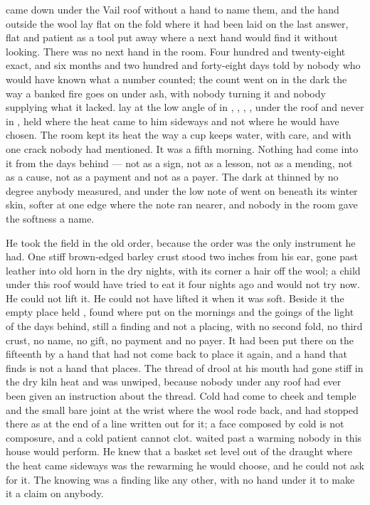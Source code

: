 
 came down under the Vail roof without a hand to name them, and the hand outside the wool lay flat on the fold where it had been laid on the last answer, flat and patient as a tool put away where a next hand would find it without looking. There was no next hand in the room. Four hundred and twenty-eight exact, and six months and two hundred and forty-eight days told by nobody who would have known what a number counted; the count went on in the dark the way a banked fire goes on under ash, with nobody turning it and nobody supplying what it lacked.  lay at the low angle of  in , , , , under the roof and never in , held where the heat came to him sideways and not where he would have chosen. The room kept its heat the way a cup keeps water, with care, and with one crack nobody had mentioned. It was a fifth morning. Nothing had come into it from the days behind --- not as a sign, not as a lesson, not as a mending, not as a cause, not as a payment and not as a payer. The dark at  thinned by no degree anybody measured, and under  the low note of  went on beneath its winter skin, softer at one edge where the note ran nearer, and nobody in the room gave the softness a name.

He took the field in the old order, because the order was the only instrument he had. One stiff brown-edged barley crust stood two inches from his ear, gone past leather into old horn in the dry nights, with its corner a hair off the wool; a child under this roof would have tried to eat it four nights ago and would not try now. He could not lift it. He could not have lifted it when it was soft. Beside it the empty place held , found where put on the mornings and the goings of the light of the days behind, still a finding and not a placing, with no second fold, no third crust, no name, no gift, no payment and no payer. It had been put there on the fifteenth by a hand that had not come back to place it again, and a hand that finds is not a hand that places. The thread of drool at his mouth had gone stiff in the dry kiln heat and was unwiped, because nobody under any roof had ever been given an instruction about the thread. Cold had come to cheek and temple and the small bare joint at the wrist where the wool rode back, and had stopped there as at the end of a line written out for it; a face composed by cold is not composure, and a cold patient cannot clot.  waited past a warming nobody in this house would perform. He knew that a basket set level out of the draught where the heat came sideways was the rewarming he would choose, and he could not ask for it. The knowing was a finding like any other, with no hand under it to make it a claim on anybody.

